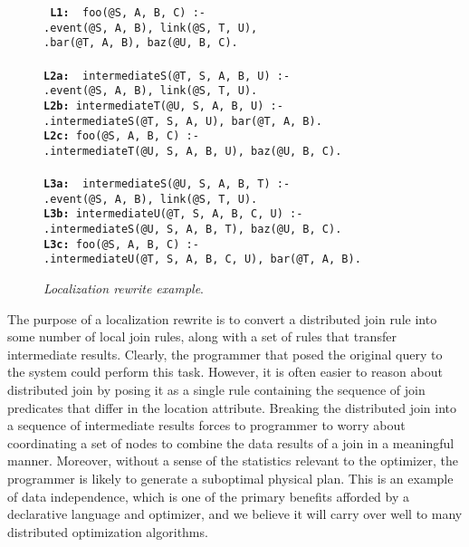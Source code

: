 \documentclass{vldb}
\newcommand{\datalogspace}{\textcolor[gray]{1}{.}\hspace{0.5in}}
\begin{document}
\begin{figure}
\centering
\begin{boxedminipage}{3.6in}
\small{\tt
{\bf L1: } foo(@S, A, B, C) :- \\
\datalogspace event(@S, A, B), link(@S, T, U), \\
\datalogspace bar(@T, A, B), baz(@U, B, C).  \\ \\
{\bf L2a: } intermediateS(@T, S, A, B, U) :-  \\
\datalogspace event(@S, A, B), link(@S, T, U). \\
{\bf L2b:} intermediateT(@U, S, A, B, U) :- \\
\datalogspace intermediateS(@T, S, A, U), bar(@T, A, B). \\
{\bf L2c:} foo(@S, A, B, C) :- \\
\datalogspace intermediateT(@U, S, A, B, U), baz(@U, B, C).\\ \\
{\bf L3a: } intermediateS(@U, S, A, B, T) :-  \\
\datalogspace event(@S, A, B), link(@S, T, U). \\
{\bf L3b:} intermediateU(@T, S, A, B, C, U) :- \\
\datalogspace intermediateS(@U, S, A, B, T), baz(@U, B, C). \\
{\bf L3c:} foo(@S, A, B, C) :- \\
\datalogspace intermediateU(@T, S, A, B, C, U), bar(@T, A, B).
}
\small{\caption{\label{fig:localization}\emph{\small Localization rewrite example}.}}
\end{boxedminipage}
\end{figure}

The purpose of a localization rewrite is to convert a distributed join rule
into some number of local join rules, along with a set of rules that transfer 
intermediate results. Clearly, the programmer that posed the original query 
to the system could perform this task. However, it is often easier to reason
about distributed join by posing it as a single rule containing the sequence
of join predicates that differ in the location attribute.  Breaking the distributed
join into a sequence of intermediate results forces to programmer to worry about
coordinating a set of nodes to combine the data results of a join in a meaningful 
manner. Moreover, without a sense of the statistics relevant to the optimizer, the
programmer is likely to generate a suboptimal physical plan. This is an example of data independence, which is one of the primary benefits afforded by a declarative 
language and optimizer, and we believe it will  carry over well to many 
distributed optimization algorithms.
\end{document}
